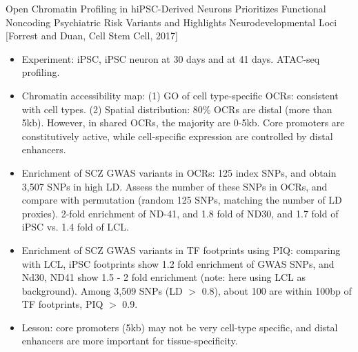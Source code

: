 \documentclass{report}
\begin{document}
Open Chromatin Profiling in hiPSC-Derived Neurons Prioritizes Functional Noncoding Psychiatric Risk Variants and Highlights Neurodevelopmental Loci [Forrest and Duan, Cell Stem Cell, 2017]
\begin{itemize}
	
	\item Experiment: iPSC, iPSC neuron at 30 days and at 41 days. ATAC-seq profiling. 
	
	\item Chromatin accessibility map: (1) GO of cell type-specific OCRs: consistent with cell types. (2) Spatial distribution: 80\% OCRs are distal (more than 5kb). However, in shared OCRs, the majority are 0-5kb. Core promoters are constitutively active, while cell-specific expression are controlled by distal enhancers. 
	
	\item Enrichment of SCZ GWAS variants in OCRs: 125 index SNPs, and obtain 3,507 SNPs in high LD. Assess the number of these SNPs in OCRs, and compare with permutation (random 125 SNPs, matching the number of LD proxies). 2-fold enrichment of ND-41, and 1.8 fold of ND30, and 1.7 fold of iPSC vs. 1.4 fold of LCL. 
	
	\item Enrichment of SCZ GWAS variants in TF footprints using PIQ: comparing with LCL, iPSC footprints show 1.2 fold enrichment of GWAS SNPs, and Nd30, ND41 show 1.5 - 2 fold enrichment (note: here using LCL as background). Among 3,509 SNPs (LD $>$ 0.8), about 100 are within 100bp of TF footprints, PIQ $>$ 0.9.  
	
	\item Lesson: core promoters (5kb) may not be very cell-type specific, and distal enhancers are more important for tissue-specificity. 
\end{itemize}
\end{document}
